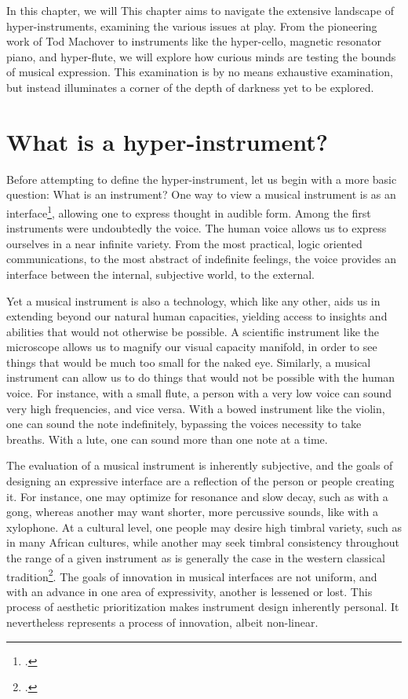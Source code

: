 \documentclass[12pt,twoside,maitrise]{dms_ks}
\theoremstyle{definition}
\begin{document}
In this chapter, we will 
This chapter aims to navigate the extensive landscape of hyper-instruments, examining the various issues at play.
From the pioneering work of Tod Machover to instruments like the hyper-cello, magnetic resonator piano, and hyper-flute, we will explore how curious minds are testing the bounds of musical expression.
This examination is by no means exhaustive examination, but instead illuminates a corner of the depth of darkness yet to be explored. 

\section{What is a hyper-instrument?}

Before attempting to define the hyper-instrument, let us begin with a more basic question: What is an instrument?
One way to view a musical instrument is as an interface\footcite{noauthor_instrument_nodate}, allowing one to express thought in audible form. 
Among the first instruments were undoubtedly the voice. 
The human voice allows us to express ourselves in a near infinite variety.
From the most practical, logic oriented communications, to the most abstract of indefinite feelings, the voice provides an interface between the internal, subjective world, to the external. 

Yet a musical instrument is also a technology, which like any other, aids us in extending beyond our natural human capacities, yielding access to insights and abilities that would not otherwise be possible. 
A scientific instrument like the microscope allows us to magnify our visual capacity manifold, in order to see things that would be much too small for the naked eye. 
Similarly, a musical instrument can allow us to do things that would not be possible with the human voice. 
For instance, with a small flute, a person with a very low voice can sound very high frequencies, and vice versa. 
With a bowed instrument like the violin, one can sound the note indefinitely, bypassing the voices necessity to take breaths. 
With a lute, one can sound more than one note at a time. 

The evaluation of a musical instrument is inherently subjective, and the goals of designing an expressive interface are a reflection of the person or people creating it. 
For instance, one may optimize for resonance and slow decay, such as with a gong, whereas another may want shorter, more percussive sounds, like with a xylophone. 
At a cultural level, one people may desire high timbral variety, such as in many African cultures, while another may seek timbral consistency throughout the range of a given instrument as is generally the case in the western classical tradition\footcite[69]{fales_fusion_1994}.
The goals of innovation in musical interfaces are not uniform, and with an advance in one area of expressivity, another is lessened or lost. 
This process of aesthetic prioritization makes instrument design inherently personal. It nevertheless represents a process of innovation, albeit non-linear. 
\end{document}

